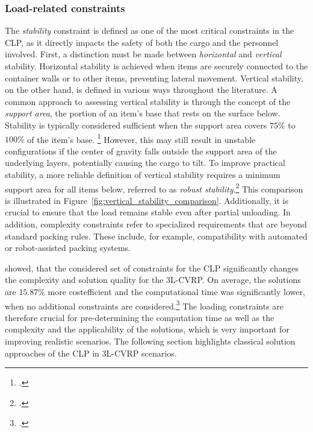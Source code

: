 \subsubsection{Load-related constraints}

The \textit{stability} constraint is defined as one of the most critical constraints
in the \gls{CLP}, as it directly impacts the safety of both the cargo and the personnel involved.
First, a distinction must be made between \textit{horizontal} and \textit{vertical} stability.
Horizontal stability is achieved when items are securely connected to the
container walls or to other items, preventing lateral movement. Vertical
stability, on the other hand, is defined in various ways throughout the
literature. A common approach to assessing vertical stability is through the concept of the \textit{support
    area}, the portion of an item's base that rests on the surface below. Stability is typically
considered sufficient when the support area covers $75\%$ to $100\%$ of the item’s base. \footcite[cf.][p. 344]{gendreau_tabu_2006} However,
this may still result in unstable configurations if the center of gravity falls outside the
support area of the underlying layers, potentially causing the cargo to tilt. To improve practical stability,
a more reliable definition of vertical stability requires a minimum support area for all items below,
referred to as \textit{robust stability}.\footcite[cf.][p. 1140]{ceschia_local_2013} This comparison is illustrated in Figure~\ref{fig:vertical_stability_comparison}.
Additionally, it is crucial to ensure that the load remains stable even after partial unloading.
In addition, complexity constraints refer to specialized
requirements that are beyond standard packing rules. These include, for example, compatibility with automated or robot-assisted packing systems.


\cite{gendreau_tabu_2006} showed, that the considered set of constraints for the \gls{CLP} significantly
changes the complexity and solution quality for the \gls{3L-CVRP}. On average, the solutions are $15.87\%$ more
costefficient and the computational time was significantly lower, when no additional constraints are considered.\footcite[cf.][p. 348]{gendreau_tabu_2006}
The loading constraints are therefore crucial for pre-determining the computation time as well as the complexity and the applicability
of the solutions, which is very important for improving realistic scenarios.
The following section highlights classical solution approaches of the \gls{CLP} in \gls{3L-CVRP} scenarios.



